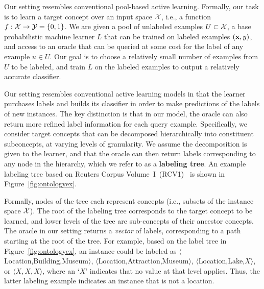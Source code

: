 \documentclass[10pt,conference,compsocconf]{IEEEtran}
\begin{document}
Our setting resembles conventional pool-based active learning.
Formally, our task is to learn a target concept over an input space ${\cal X}$,
i.e., a 
function $f : {\cal X} \rightarrow {\cal Y}=\{0, 1\}$.  We are given a pool of 
unlabeled examples $U \subset {\cal X}$, a base probabilistic machine learner $L$ that can
be trained on labeled examples $({\bf x}, y)$, and
access to an oracle that can be queried at some cost for the label of any example $u \in U$.
Our goal is to choose a relatively small number of examples from $U$ to be labeled, 
and train $L$ on the labeled examples to output a relatively accurate classifier.

Our setting resembles conventional active learning models in that the learner
purchases labels and builds its classifier in order to make predictions of the labels of new 
instances.  The key distinction is that in our model, the oracle can also return
more refined label information for each query example.  Specifically, we consider target
concepts that can be decomposed hierarchically into constituent subconcepts,
at varying levels of granularity.  We assume the decomposition is given
to the learner, and that the oracle can then return labels corresponding to any
node in the hierarchy, which we refer to as a {\bf labeling tree}.  An
example labeling tree based on Reuters Corpus Volume~I~(RCV1)~\cite{Lewis2004}
is shown in Figure~\ref{fig:ontologyex}.

Formally, nodes of the tree each represent concepts (i.e., subsets of the instance space ${\cal X}$).
The root of the labeling tree corresponds to the target concept to be learned, and lower 
levels of the tree are sub-concepts of their ancestor concepts.  The oracle in our
setting returns a {\it vector} of labels, corresponding to a path starting at the root of the tree.
For example, based on the label tree in
Figure~\ref{fig:ontologyex}, an instance could be labeled as
$\langle$Location,Building,Museum$\rangle$,  $\langle$Location,Attraction,Museum$\rangle$,
$\langle$Location,Lake,$X\rangle$, or $\langle X,X,X \rangle$, where an `$X$' indicates
that no value at that level applies.
Thus, the latter labeling example indicates an instance that is not a location.
\end{document}
